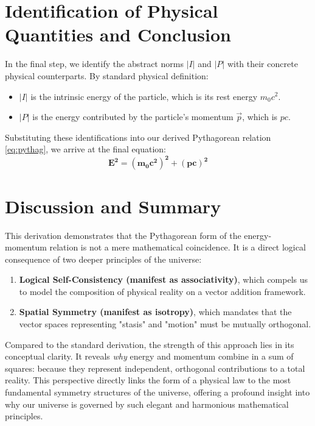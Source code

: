 \documentclass[12pt, a4paper]{article}
\begin{document}
\section{Identification of Physical Quantities and Conclusion}

In the final step, we identify the abstract norms $|I|$ and $|P|$ with their concrete physical counterparts. By standard physical definition:
\begin{itemize}
    \item $|I|$ is the intrinsic energy of the particle, which is its rest energy $m_0c^2$.
    \item $|P|$ is the energy contributed by the particle's momentum $\vec{p}$, which is $pc$.
\end{itemize}
Substituting these identifications into our derived Pythagorean relation \eqref{eq:pythag}, we arrive at the final equation:
\begin{equation}
    \mathbf{E^2 = (m_0c^2)^2 + (pc)^2}
\end{equation}

\section{Discussion and Summary}

This derivation demonstrates that the Pythagorean form of the energy-momentum relation is not a mere mathematical coincidence. It is a direct logical consequence of two deeper principles of the universe:
\begin{enumerate}
    \item \textbf{Logical Self-Consistency (manifest as associativity)}, which compels us to model the composition of physical reality on a vector addition framework.
    \item \textbf{Spatial Symmetry (manifest as isotropy)}, which mandates that the vector spaces representing "stasis" and "motion" must be mutually orthogonal.
\end{enumerate}
Compared to the standard derivation, the strength of this approach lies in its conceptual clarity. It reveals \textit{why} energy and momentum combine in a sum of squares: because they represent independent, orthogonal contributions to a total reality. This perspective directly links the form of a physical law to the most fundamental symmetry structures of the universe, offering a profound insight into why our universe is governed by such elegant and harmonious mathematical principles.
\end{document}
